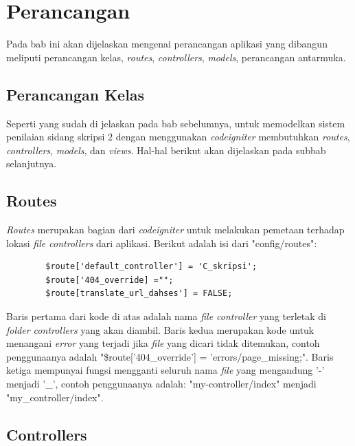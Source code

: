 \chapter{Perancangan}
\label{chap: perancangan}
	
	Pada bab ini akan dijelaskan mengenai perancangan aplikasi yang dibangun meliputi perancangan kelas, \textit{routes}, \textit{controllers}, \textit{models}, perancangan antarmuka.
	
	\section{Perancangan Kelas}
	\label{sec: rancangKelas}
	
	Seperti yang sudah di jelaskan pada bab sebelumnya, untuk memodelkan sistem penilaian sidang skripsi 2 dengan menggunakan \textit{codeigniter} membutuhkan \textit{routes}, \textit{controllers}, \textit{models}, dan \textit{views}. Hal-hal berikut akan dijelaskan pada subbab selanjutnya.
	
	\section{Routes}
	\label{sec: routes}
	
	\textit{Routes} merupakan bagian dari \textit{codeigniter} untuk melakukan pemetaan terhadap lokasi \textit{file controllers} dari aplikasi. Berikut adalah isi dari "config/routes":
	\begin{lstlisting}
		$route['default_controller'] = 'C_skripsi';
		$route['404_override] ="";
		$route[translate_url_dahses'] =	FALSE;
	\end{lstlisting}
	Baris pertama dari kode di atas adalah nama \textit{file controller} yang terletak di \textit{folder controllers} yang akan diambil. Baris kedua merupakan kode untuk menangani \textit{error} yang terjadi jika \textit{file} yang dicari tidak ditemukan, contoh penggunaanya adalah "\$route['404\_override'] = 'errors/page\_missing;". Baris ketiga mempunyai fungsi mengganti seluruh nama \textit{file} yang mengandung '-' menjadi '\_', contoh penggunaanya adalah: "my-controller/index"	menjadi "my\_controller/index".

	\section{Controllers}
	\label{sec: controllers}
	
